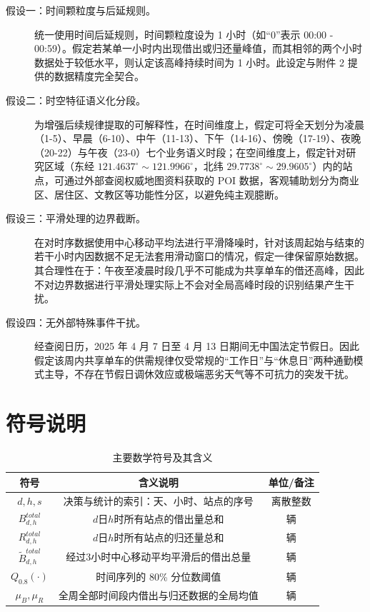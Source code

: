 \documentclass[a4paper, 12pt]{ctexart}
\begin{document}
\begin{description}
    \item[假设一：时间颗粒度与后延规则。] 统一使用时间后延规则，时间颗粒度设为 1 小时（如“0”表示 00:00 - 00:59）。假定若某单一小时内出现借出或归还量峰值，而其相邻的两个小时数据处于较低水平，则认定该高峰持续时间为 1 小时。此设定与附件 2 提供的数据精度完全契合。
    
    \item[假设二：时空特征语义化分段。] 为增强后续规律提取的可解释性，在时间维度上，假定可将全天划分为凌晨（1-5）、早晨（6-10）、中午（11-13）、下午（14-16）、傍晚（17-19）、夜晚（20-22）与午夜（23-0）七个业务语义时段；在空间维度上，假定针对研究区域（东经 $121.4637^\circ \sim 121.9966^\circ$，北纬 $29.7738^\circ \sim 29.9605^\circ$）内的站点，可通过外部查阅权威地图资料获取的 POI 数据，客观辅助划分为商业区、居住区、文教区等功能性分区，以避免纯主观臆断。
    
    \item[假设三：平滑处理的边界截断。] 在对时序数据使用中心移动平均法进行平滑降噪时，针对该周起始与结束的若干小时内因数据不足无法套用滑动窗口的情况，假定一律保留原始数据。其合理性在于：午夜至凌晨时段几乎不可能成为共享单车的借还高峰，因此不对边界数据进行平滑处理实际上不会对全局高峰时段的识别结果产生干扰。
    
    \item[假设四：无外部特殊事件干扰。] 经查阅日历，2025 年 4 月 7 日至 4 月 13 日期间无中国法定节假日。因此假定该周内共享单车的供需规律仅受常规的“工作日”与“休息日”两种通勤模式主导，不存在节假日调休效应或极端恶劣天气等不可抗力的突发干扰。
\end{description}

\section{符号说明}

\begin{table}[H]
    \centering
    \caption{主要数学符号及其含义}
    \begin{tabular}{ccc}
        \toprule
        \textbf{符号} & \textbf{含义说明} & \textbf{单位/备注} \\
        \midrule
        $d, h, s$ & 决策与统计的索引：天、小时、站点的序号 & 离散整数 \\
        $B^{total}_{d, h}$ & $d$日$h$时所有站点的借出量总和 & 辆 \\
        $R^{total}_{d, h}$ & $d$日$h$时所有站点的归还量总和 & 辆 \\
        $\tilde{B}^{total}_{d, h}$ & 经过3小时中心移动平均平滑后的借出总量 & 辆 \\
        $Q_{0.8}(\cdot)$ & 时间序列的 80\% 分位数阈值 & 辆 \\
        $\mu_{B}, \mu_{R}$ & 全周全部时间段内借出与归还数据的全局均值 & 辆 \\
        \bottomrule
    \end{tabular}
\end{table} 
\end{document}
